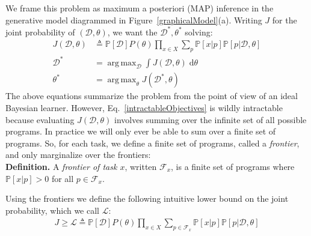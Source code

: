 \documentclass{article}
\newcommand{\lowerBound}{\mathscr{L}}
\DeclareMathOperator*{\argmax}{arg\,max} %
\newcommand{\probability}{\mathds{P}} %
\begin{document}
We frame this problem as maximum a posteriori (MAP) inference in the generative model diagrammed in Figure~\ref{graphicalModel}(a). Writing $J$ for the joint probability of $(\mathcal{D},\theta)$, we want the $\mathcal{D}^*,\theta^*$ solving:
\begin{align}\label{intractableObjectives}
\nonumber  J(\mathcal{D},\theta)&\triangleq \probability[\mathcal{D}]P(\theta)\prod_{x\in X} \sum_p \probability[x|p]\probability[p|\mathcal{D},\theta]\\
  \mathcal{D}^* &= \argmax_{\mathcal{D}}\int J(\mathcal{D},\theta)\;\mathrm{d}\theta \\
\nonumber  \theta^*& =\argmax_\theta J(\mathcal{D}^*,\theta)
\end{align}
The above equations summarize the problem from the point of view of an ideal Bayesian learner.
However, Eq.~\ref{intractableObjectives}
is wildly intractable because evaluating $J(\mathcal{D},\theta)$ involves
summing over the  infinite set of all possible programs.
In practice we will only ever be able to sum over a finite set of programs.
So, for each task, we define a finite set of programs, called a \emph{frontier}, and only marginalize over the frontiers:
\\\noindent\textbf{Definition.} A \emph{frontier of task $x$}, written $\mathcal{F}_x$,
is a finite set of programs where $\probability[x|p] > 0$ for all $p\in \mathcal{F}_x$.

Using the frontiers we  define the following intuitive lower bound on the joint probability, which we call $\lowerBound$:
\begin{align}
 J\geq \lowerBound\triangleq\probability[\mathcal{D}]P(\theta)\prod_{x\in X} \sum_{p\in \mathcal{F}_x} \probability[x|p]\probability[p|\mathcal{D},\theta]
\end{align}


\end{document}
